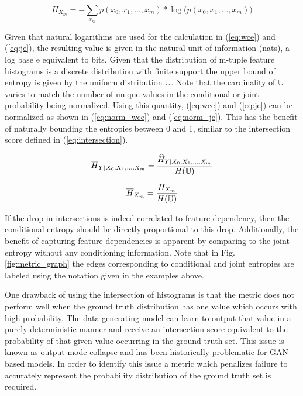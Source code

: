 \begin{equation}
\label{eq:je}
{H}_{X_m} = -\sum_{x_m} p(x_0, x_1,...,x_m)  * \log \big({{p(x_0,x_1,...,x_m)}}\big)
\end{equation}

Given that natural logarithms are used for the calculation in (\ref{eq:wce}) and (\ref{eq:je}), the resulting value is given in the natural unit of information (nats), a log base e equivalent to bits. Given that the distribution of m-tuple feature histograms is a discrete distribution with finite support the upper bound of entropy is given by the uniform distribution $\mathbb{U}$. Note that the cardinality of $\mathbb{U}$ varies to match the number of unique values in the conditional or joint probability being normalized. Using this quantity, (\ref{eq:wce}) and (\ref{eq:je}) can be normalized as shown in (\ref{eq:norm_wce}) and (\ref{eq:norm_je}). This has the benefit of naturally bounding the entropies between 0 and 1, similar to the intersection score defined in (\ref{eq:intersection}).

\begin{equation}
\label{eq:norm_wce}
\overline{H}_{Y|X_0, X_1, ..., X_m} = {{\widehat{H}_{Y|X_0, X_1, ..., X_m}} \over{ H(\mathbb{U})}}
\end{equation}

\begin{equation}
\label{eq:norm_je}
\overline{H}_{X_m} = {{{H}_{X_m}} \over{ H(\mathbb{U})}}
\end{equation}

If the drop in intersections is indeed correlated to feature dependency, then the conditional entropy should be directly proportional to this drop. Additionally, the benefit of capturing feature dependencies is apparent by comparing to the joint entropy without any conditioning information. Note that in Fig. \ref{fig:metric_graph} the edges corresponding to conditional and joint entropies are labeled using the notation given in the examples above.

One drawback of using the intersection of histograms is that the metric does not perform well when the ground truth distribution has one value which occurs with high probability. The data generating model can learn to output that value in a purely deterministic manner and receive an intersection score equivalent to the probability of that given value occurring in the ground truth set. This issue is known as output mode collapse and has been historically problematic for GAN based models. In order to identify this issue a metric which penalizes failure to accurately represent the probability distribution of the ground truth set is required. 

